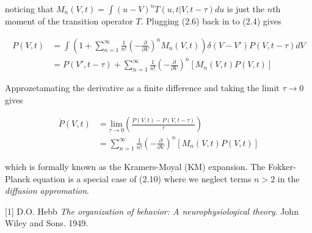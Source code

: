 \documentclass{ucetd}
\begin{document}
\begin{appendices}
noticing that $M_{n}(V,t) = \int(u-V)^{n}T(u, t | V, t-\tau)du$ is just the $n$th moment of the transition operator $T$. Plugging (2.6) back in to (2.4) gives 

\begin{align}
P(V, t) &= \int \left(1 + \sum_{n=1}^{\infty} \frac{1}{n!}\left(-\frac{\partial}{\partial V}\right)^{n} M_{n}(V,t)\right)\delta(V-V')P(V, t-\tau)dV\\
&= P(V', t-\tau) + \sum_{n=1}^{\infty} \frac{1}{n!}\left(-\frac{\partial}{\partial V}\right)^{n} \left[M_{n}(V,t)P(V,t)\right]
\end{align} 

Approzetamating the derivative as a finite difference and taking the limit $\tau\rightarrow 0$ gives

\begin{align}
\dot{P}(V,t)  &= \underset{\tau\rightarrow 0}{\mathrm{lim}}\left(\frac{P(V, t)-P(V, t-\tau)}{\tau}\right)\\
&= \sum_{n=1}^{\infty} \frac{1}{n!}\left(-\frac{\partial}{\partial V}\right)^{n} \left[M_{n}(V,t)P(V,t)\right]
\end{align} 

which is formally known as the Kramers-Moyal (KM) expansion. The Fokker-Planck equation is a special case of (2.10) where we neglect terms $n>2$ in the \emph{diffusion appromation}.
\end{appendices}

\makebibliography

[1] D.O. Hebb \textit{The organization of behavior: A neurophysiological theory}. John Wiley and Sons. 1949.

%
%
\end{document}
